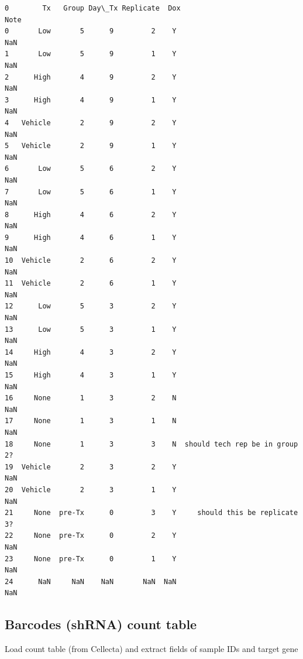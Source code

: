 \documentclass[11pt]{article}
\begin{document}
\begin{Verbatim}[commandchars=\\\{\}]
0        Tx   Group Day\_Tx Replicate  Dox                            Note  
0       Low       5      9         2    Y                             NaN  
1       Low       5      9         1    Y                             NaN  
2      High       4      9         2    Y                             NaN  
3      High       4      9         1    Y                             NaN  
4   Vehicle       2      9         2    Y                             NaN  
5   Vehicle       2      9         1    Y                             NaN  
6       Low       5      6         2    Y                             NaN  
7       Low       5      6         1    Y                             NaN  
8      High       4      6         2    Y                             NaN  
9      High       4      6         1    Y                             NaN  
10  Vehicle       2      6         2    Y                             NaN  
11  Vehicle       2      6         1    Y                             NaN  
12      Low       5      3         2    Y                             NaN  
13      Low       5      3         1    Y                             NaN  
14     High       4      3         2    Y                             NaN  
15     High       4      3         1    Y                             NaN  
16     None       1      3         2    N                             NaN  
17     None       1      3         1    N                             NaN  
18     None       1      3         3    N  should tech rep be in group 2?  
19  Vehicle       2      3         2    Y                             NaN  
20  Vehicle       2      3         1    Y                             NaN  
21     None  pre-Tx      0         3    Y     should this be replicate 3?  
22     None  pre-Tx      0         2    Y                             NaN  
23     None  pre-Tx      0         1    Y                             NaN  
24      NaN     NaN    NaN       NaN  NaN                             NaN  
    \end{Verbatim}

    
    \subsection{Barcodes (shRNA) count
table}\label{barcodes-shrna-count-table}

Load count table (from Cellecta) and extract fields of sample IDs and
target gene
\end{document}
